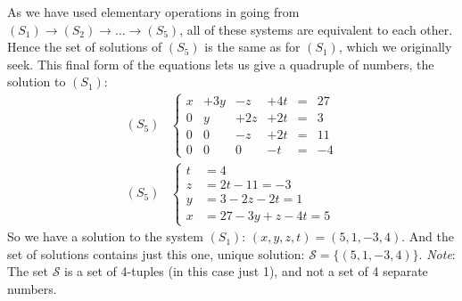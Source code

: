 \documentclass[usenames,dvipsnames,aspectratio=169,10pt]{beamer}
\numberwithin{equation}{section}
\begin{document}
\begin{frame}
As we have used elementary operations in going from $(S_1) \to (S_2) \to \dots \to (S_5)$, all of these systems are equivalent to each other. Hence the set of solutions of $(S_5)$ is the same as for $(S_1)$, which we originally seek. This final form of the equations lets us give a quadruple of numbers, the solution to $(S_1)$:
\begin{align*}
(S_5)
&\left\{
\begin{matrix}
   x & +3y & -z & +4t &=& 27 \\
   0  & y & +2z & +2t &=& 3 \\
   0  & 0 & -z & +2t &=&  11 \\
   0  & 0 & 0 & -t &=& -4
\end{matrix}
\right. \\
(S_5)
&\left\{
\begin{array}{ll}
   t &= 4 \\
   z &= 2t -  11 = -3\\
   y &= 3 -2z - 2t = 1\\
   x &= 27 - 3y + z - 4t = 5 	
\end{array}
\right. 
\end{align*}
So we have a solution to the system $(S_1)$: $(x,y,z,t)=(5,1,-3,4)$. And the set of solutions contains just this one, unique solution: $\mathcal{S}=\{(5,1,-3,4)\}$. \textit{Note}: The set $\mathcal{S}$ is a set of 4-tuples (in this case just 1), and not a set of 4 separate numbers.
\end{frame}
\end{document}
